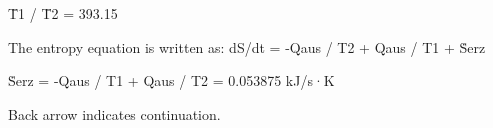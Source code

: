 T̄1 / T̄2 = 393.15  

The entropy equation is written as:  
dS/dt = -Qaus / T2 + Qaus / T1 + Ṡerz  

Ṡerz = -Qaus / T1 + Qaus / T2 = 0.053875 kJ/s·K  

Back arrow indicates continuation.